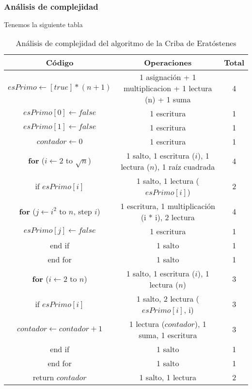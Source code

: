 \subsubsection*{Análisis de complejidad}
Tenemos la siguiente tabla
\begin{table}[H]
    \centering
    \begin{tabular}{|c|c|c|}
        \hline
        \textbf{Código} & \textbf{Operaciones} & \textbf{Total} \\
        \hline
        $esPrimo \gets [true] * (n+1)$ & 1 asignación + 1 multiplicacion + 1 lectura (n) + 1 suma & 4 \\
        \hline
        $esPrimo[0] \gets false$ & 1 escritura & 1 \\
        \hline
        $esPrimo[1] \gets false$ & 1 escritura & 1 \\
        \hline
        $contador \gets 0$ & 1 escritura & 1 \\
        \hline
        \textbf{for} ($i \gets 2$ to $\sqrt{n}$) & 1 salto, 1 escritura ($i$), 1 lectura ($n$), 1 raíz cuadrada & 4 \\
        \hline
        if $esPrimo[i]$ & 1 salto, 1 lectura ($esPrimo[i]$) & 2\\
        \hline
        \textbf{for} ($j \gets i^2$ to $n$, step $i$) & 1 escritura, 1 multiplicación (i * i), 2 lectura & 4 \\
        \hline
        $esPrimo[j] \gets false$ & 1 escritura & 1 \\
        \hline
        end if & 1 salto & 1 \\
        \hline
        end for & 1 salto & 1 \\
        \hline
        \textbf{for} ($i \gets 2$ to $n$) & 1 salto, 1 escritura ($i$), 1 lectura ($n$) & 3 \\
        \hline
        if $esPrimo[i]$ & 1 salto, 2 lectura ($esPrimo[i]$, i) & 3 \\
        \hline
        $contador \gets contador + 1$ & 1 lectura ($contador$), 1 suma, 1 escritura & 3 \\
        \hline
        end if & 1 salto & 1 \\
        \hline
        end for & 1 salto & 1 \\
        \hline
        return $contador$ & 1 salto, 1 lectura & 2 \\
        \hline
    \end{tabular}
    \caption{Análisis de complejidad del algoritmo de la Criba de Eratóstenes}
    \label{tabla:criba}
\end{table}

